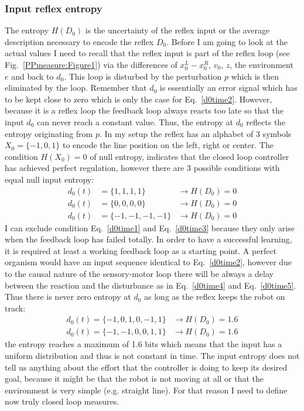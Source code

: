 \subsubsection{Input reflex entropy}
The entropy $H(D_0)$ is the uncertainty of the reflex input or the
average description necessary to encode the reflex $D_{0}$. Before
I am going to look at the actual values I need to recall that
the reflex input is part of the reflex loop (see Fig.~\ref{PPmeasure:Figure1})
via the differences of $x_0^L-x_0^R$, 
$v_0$, $z$, the environment $e$ and back to $d_0$. This
loop is disturbed by the perturbation $p$ which is then eliminated
by the loop. Remember that $d_0$ is essentially an error signal which has to be
kept close to zero which is only the case for Eq.~\ref{d0time2}.
However, because it is a reflex loop the feedback
loop always reacts too late so that the input $d_0$ can never
reach a constant value. Thus, the entropy at $d_0$ reflects the
entropy originating from $p$. In my
setup the reflex has an alphabet of 3 symbols $X_0=\{-1,0,1\}$ to
encode the line position on the left, right or center. The condition
$H(X_0)=0$ of null entropy, indicates that the closed loop controller
has achieved perfect regulation, however there are 3 possible
conditions with equal null input entropy:
\begin{eqnarray}
d_{0}(t) & = \{1 ,1, 1, 1\} & \rightarrow H(D_0)=0 \label{d0time1} \\
d_{0}(t) & = \{0, 0, 0, 0\} & \rightarrow H(D_0)=0 \label{d0time2} \\
d_{0}(t) & = \{-1, -1, -1, -1\} & \rightarrow H(D_0)=0 \label{d0time3}
\end{eqnarray}
I can exclude condition Eq.~\ref{d0time1} and Eq.~\ref{d0time3} because
they only arise when the feedback loop has failed totally.
In order to have a successful learning, it is required at least a working feedback 
loop \citep{RadicalConstruct} as a starting point.
A perfect organism would have an input sequence identical to Eq.~\ref{d0time2},
 however due to the causal nature of the sensory-motor loop there will be always a 
delay between the reaction and the disturbance as in  Eq.~\ref{d0time4} and Eq.~\ref{d0time5}.
Thus there is never  zero entropy at $d_0$ as long as the reflex keeps the robot on track:
\begin{eqnarray}
d_0(t)=\{-1, 0, 1, 0, -1, 1\} &\rightarrow  H(D_0)=1.6\label{d0time4}\\
d_0(t)=\{-1, -1, 0, 0 ,1, 1\} &\rightarrow  H(D_0)=1.6\label{d0time5}
\end{eqnarray}
the entropy reaches a maximum of 1.6 bits which means that the input
has a uniform distribution and thus is not constant in time. The
input entropy does not tell us anything about the effort that the
controller is doing to keep its desired goal, because it might be that
the robot is not moving at all or that the environment is very
simple (e.g. straight line). For that reason I need to define
now truly closed loop measures.


